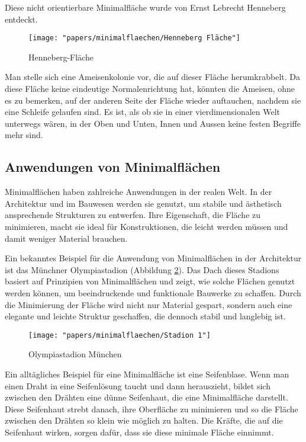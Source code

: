 \begin{itemize}
	Diese nicht orientierbare Minimalfläche wurde von Ernst Lebrecht Henneberg entdeckt.
%
%
\begin{figure}
	\centering
	\texttt{[image: "papers/minimalflaechen/Henneberg Fläche"]}
	\caption{Henneberg-Fläche \cite{minimalflaechen:henneberg}}
	\label{fig:henneberg-flache}
\end{figure}

Man stelle sich eine Ameisenkolonie vor, die auf dieser Fläche herumkrabbelt.
Da diese Fläche keine eindeutige Normalenrichtung hat, könnten die Ameisen, ohne es zu bemerken, auf der anderen Seite der Fläche wieder auftauchen, nachdem sie eine Schleife gelaufen sind.
Es ist, als ob sie in einer vierdimensionalen Welt unterwegs wären, in der Oben und Unten, Innen und Aussen keine festen Begriffe mehr sind.


\end{itemize}

\subsection{Anwendungen von Minimalflächen
	\label{minimalflaechen:subsection:Anwendungen von Minimalflächen}}
Minimalflächen haben zahlreiche Anwendungen in der realen Welt.
In der Architektur und im Bauwesen werden sie genutzt, um stabile und ästhetisch ansprechende Strukturen zu entwerfen.
%
Ihre Eigenschaft, die Fläche zu minimieren, macht sie ideal für Konstruktionen, die leicht werden müssen und damit weniger Material brauchen.

Ein bekanntes Beispiel für die Anwendung von Minimalflächen in der Architektur ist das Münchner Olympiastadion (Abbildung \ref{fig:stadion-1}).
%
%
Das Dach dieses Stadions basiert auf Prinzipien von Minimalflächen und zeigt, wie solche Flächen genutzt werden können, um beeindruckende und funktionale Bauwerke zu schaffen.
Durch die Minimierung der Fläche wird nicht nur Material gespart, sondern auch eine elegante und leichte Struktur geschaffen, die dennoch stabil und langlebig ist.
\begin{figure}
	\centering
	\texttt{[image: "papers/minimalflaechen/Stadion 1"]}
	\caption{Olympiastadion München \cite{minimalflaechen:Olympiastadion}}
	\label{fig:stadion-1}
\end{figure}


Ein alltägliches Beispiel für eine Minimalfläche ist eine Seifenblase.
%
Wenn man einen Draht in eine Seifenlösung taucht und dann herauszieht, bildet sich zwischen den Drähten eine dünne Seifenhaut, die eine Minimalfläche darstellt.
Diese Seifenhaut strebt danach, ihre Oberfläche zu minimieren und so die Fläche zwischen den Drähten so klein wie möglich zu halten.
Die Kräfte, die auf die Seifenhaut wirken, sorgen dafür, dass sie diese minimale Fläche einnimmt.

